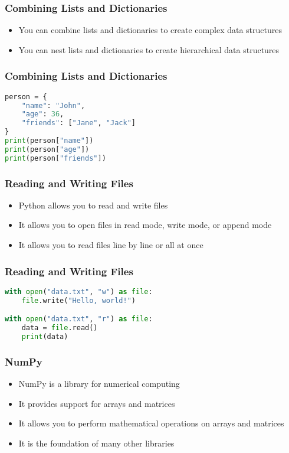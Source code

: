 \documentclass[serif, 9pt, aspectratio=32]{beamer}
\begin{document}
\begin{frame}
    \centering
    \frametitle{Combining Lists and Dictionaries}
    \begin{itemize}
        \setlength{\itemsep}{2em}
        \item You can combine lists and dictionaries to create complex data structures
        \item You can nest lists and dictionaries to create hierarchical data structures
    \end{itemize}
\end{frame}

\begin{frame}[fragile]
    \frametitle{Combining Lists and Dictionaries}
    \begin{lstlisting}[language=Python]
person = {
    "name": "John",
    "age": 36,
    "friends": ["Jane", "Jack"]
}
print(person["name"])
print(person["age"])
print(person["friends"])
    \end{lstlisting}
\end{frame}

\begin{frame}
    \centering
    \frametitle{Reading and Writing Files}
    \begin{itemize}
        \setlength{\itemsep}{2em}
        \item Python allows you to read and write files
        \item It allows you to open files in read mode, write mode, or append mode
        \item It allows you to read files line by line or all at once
    \end{itemize}
\end{frame}

\begin{frame}[fragile]
    \frametitle{Reading and Writing Files}
    \begin{lstlisting}[language=Python]
with open("data.txt", "w") as file:
    file.write("Hello, world!")

with open("data.txt", "r") as file:
    data = file.read()
    print(data)
    \end{lstlisting}
\end{frame}

\begin{frame}
    \centering
    \frametitle{NumPy}
    \begin{itemize}
        \setlength{\itemsep}{2em}
        \item NumPy is a library for numerical computing
        \item It provides support for arrays and matrices
        \item It allows you to perform mathematical operations on arrays and matrices
        \item It is the foundation of many other libraries
    \end{itemize}
\end{frame}
\end{document}
